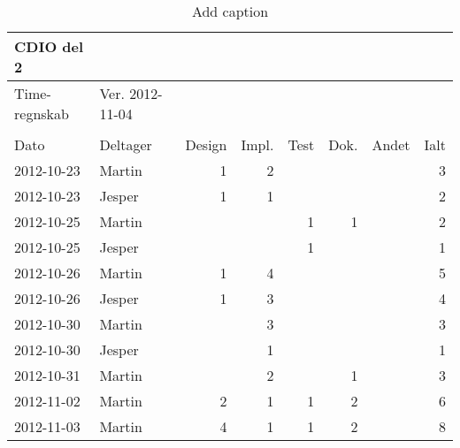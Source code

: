\begin{table}[htbp]
  \centering
  \caption{Add caption}
    \begin{tabular}{|l|l|r|r|r|r|r|r|}
    \hline
    CDIO del 2 &       &       &       &       &       &       &  \bigstrut\\
    \hline
    Time-regnskab & Ver. 2012-11-04 &       &       &       &       &       &  \bigstrut\\
    \hline
          &       &       &       &       &       &       &  \bigstrut\\
    \hline
    \multicolumn{1}{l|}{Dato} & Deltager & Design & Impl. & Test  & Dok.  & Andet & \multicolumn{1}{r}{Ialt} \bigstrut\\
    \hline
    \multicolumn{1}{l|}{2012-10-23} & Martin & 1     & 2     &       &       &       & \multicolumn{1}{r}{3} \bigstrut\\
    \hline
    \multicolumn{1}{l|}{2012-10-23} & Jesper & 1     & 1     &       &       &       & \multicolumn{1}{r}{2} \bigstrut\\
    \hline
    \multicolumn{1}{l|}{2012-10-25} & Martin &       &       & 1     & 1     &       & \multicolumn{1}{r}{2} \bigstrut\\
    \hline
    \multicolumn{1}{l|}{2012-10-25} & Jesper &       &       & 1     &       &       & \multicolumn{1}{r}{1} \bigstrut\\
    \hline
    \multicolumn{1}{l|}{2012-10-26} & Martin & 1     & 4     &       &       &       & \multicolumn{1}{r}{5} \bigstrut\\
    \hline
    \multicolumn{1}{l|}{2012-10-26} & Jesper & 1     & 3     &       &       &       & \multicolumn{1}{r}{4} \bigstrut\\
    \hline
    \multicolumn{1}{l|}{2012-10-30} & Martin &       & 3     &       &       &       & \multicolumn{1}{r}{3} \bigstrut\\
    \hline
    \multicolumn{1}{l|}{2012-10-30} & Jesper &       & 1     &       &       &       & \multicolumn{1}{r}{1} \bigstrut\\
    \hline
    \multicolumn{1}{l|}{2012-10-31} & Martin &       & 2     &       & 1     &       & \multicolumn{1}{r}{3} \bigstrut\\
    \hline
    \multicolumn{1}{l|}{2012-11-02} & Martin & 2     & 1     & 1     & 2     &       & \multicolumn{1}{r}{6} \bigstrut\\
    \hline
    \multicolumn{1}{l|}{2012-11-03} & Martin & 4     & 1     & 1     & 2     &       & \multicolumn{1}{r}{8} \bigstrut\\

\end{tabular}
\end{table}
